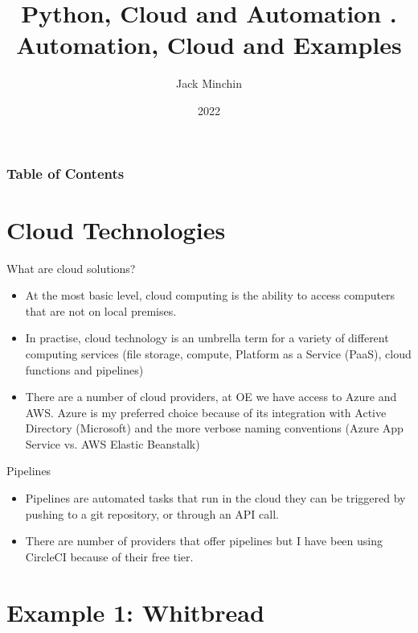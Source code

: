 \documentclass[aspectratio=169]{beamer}
\title{\large{\textbf{Python, Cloud and Automation}} \newline\newline 3. Automation, Cloud and Examples}
\author{Jack Minchin}
\institute{Tourism Economics}
\date{2022}
\begin{document}
\frame{\titlepage}

\begin{frame}
\frametitle{Table of Contents}
\tableofcontents
\end{frame}


\section{Cloud Technologies}

\begin{frame}{What are cloud solutions?}

\begin{itemize}
	\item At the most basic level, cloud computing is the ability to access computers that are not on local premises. 
	\item In practise, cloud technology is an umbrella term for a variety of different computing services (file storage, compute, Platform as a Service (PaaS), cloud functions and pipelines)
	\item There are a number of cloud providers, at OE we have access to Azure and AWS. Azure is my preferred choice because of its integration with Active Directory (Microsoft) and the more verbose naming conventions (Azure App Service vs. AWS Elastic Beanstalk)
\end{itemize}

\end{frame}

\begin{frame}{Pipelines}

\begin{itemize}
	\item Pipelines are automated tasks that run in the cloud they can be triggered by pushing to a git repository, or through an API call.
	\item There are number of providers that offer pipelines but I have been using CircleCI because of their free tier. 
\end{itemize}
\end{frame}

\section{Example 1: Whitbread}
\end{document}
